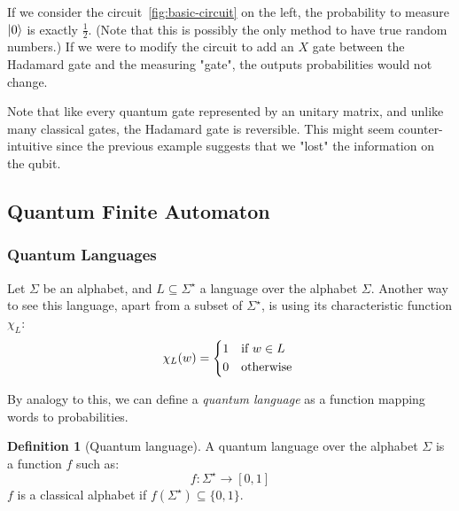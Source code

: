\documentclass[12pt,a4paper]{article}
\theoremstyle{definition}
\newtheorem*{definition}{Definition}
\DeclarePairedDelimiter\ket{\lvert}{\rangle}
\begin{document}
If we consider the circuit \ref{fig:basic-circuit} on the left, the probability to measure $\ket{0}$ is exactly $\frac{1}{2}$. (Note that this is possibly the only method to have true random numbers.) If we were to modify the circuit to add an $X$ gate between the Hadamard gate and the measuring "gate", the outputs probabilities would not change. 

Note that like every quantum gate represented by an unitary matrix, and unlike many classical gates, the Hadamard gate is reversible. This might seem counter-intuitive since the previous example suggests that we "lost" the information on the qubit. 

\subsection{Quantum Finite Automaton}
\subsubsection{Quantum Languages}
Let $\Sigma$ be an alphabet, and $L\subseteq \Sigma^\star$ a language over the alphabet $\Sigma$. Another way to see this language, apart from a subset of $\Sigma^\star$, is using its characteristic function $\chi_L$:
\begin{equation*}
    \chi_L(w) = \begin{cases*}
        1 & if $w\in L$\\
        0 & otherwise
    \end{cases*}
\end{equation*}

By analogy to this, we can define a \emph{quantum language} as a function mapping words to probabilities.
\begin{definition}[Quantum language]
    A quantum language over the alphabet $\Sigma$ is a function $f$ such as:
    \begin{equation*}
        f : \Sigma^\star \to [0, 1]
    \end{equation*}
    $f$ is a classical alphabet if $f(\Sigma^\star) \subseteq \{0, 1\}$.
\end{definition}
\end{document}
